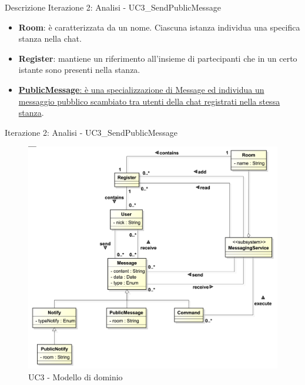 \documentclass[t]{beamer} %
\let\olditem=\item%
\renewcommand{\item}{\olditem \justifying}%
\begin{document}
\begin{frame} [allowframebreaks] {Descrizione Iterazione 2: Analisi - UC3\_SendPublicMessage}
\begin{itemize}
          MessagingService (es. /join '\#Medical' richiesta da parte dell'utente a registrarsi alla stanza Medical).        
    \item \textbf{Room}: è caratterizzata da un nome. Ciascuna istanza individua una specifica stanza nella chat.
    \item \textbf{Register}: mantiene un riferimento all’insieme di partecipanti che in un certo istante sono presenti nella stanza.
   \item \underline{\textbf{PublicMessage}: è una specializzazione di Message ed individua un messaggio pubblico scambiato tra utenti della chat registrati nella 
         stessa stanza}. 
  \end{itemize}
\end{frame}

\begin{frame} {Iterazione 2: Analisi - UC3\_SendPublicMessage}
   \begin{figure}
     \includegraphics[scale=0.27]{image_astah/Iteration_2_DomainModel/UC3_SendPublicMessage_DM.png}{\centering}
     \caption{UC3 - Modello di dominio}
     \label{fig_UC3_SPM_DM} 
   \end{figure}
\end{frame}
\end{document}
